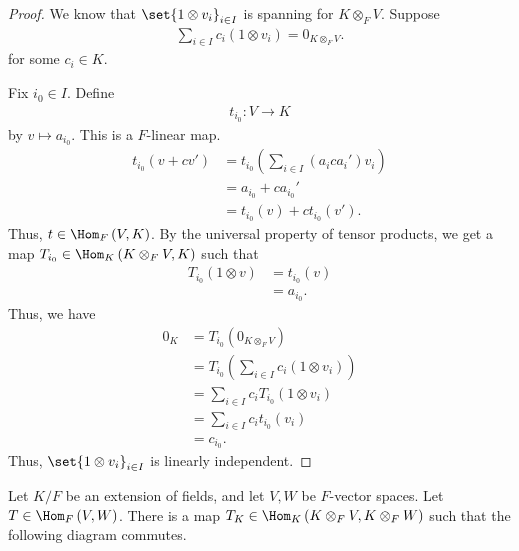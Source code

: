 \documentclass[10pt]{mypackage}
\begin{document}
  \begin{proof}
    We know that $\set{1\otimes v_i}_{i\in I}$ is spanning for $K\otimes_{F}V$. Suppose
    \begin{align*}
      \sum_{i\in I}c_i\left(1\otimes v_i\right) = 0_{K\otimes_{F}V}.
    \end{align*}
    for some $c_i\in K$.\newline

    Fix $i_0\in I$. Define
    \begin{align*}
      t_{i_0}: V \rightarrow K
    \end{align*}
    by $v\mapsto a_{i_0}$. This is a $F$-linear map.
    \begin{align*}
      t_{i_0}\left(v + cv'\right) &= t_{i_0}\left(\sum_{i\in I}\left(a_ica_i'\right) v_i\right)\\
                                  &= a_{i_0} + ca_{i_0}'\\
                                  &= t_{i_0}\left(v\right) + ct_{i_0}\left(v'\right).
    \end{align*}
    Thus, $t\in \Hom_{F}\left(V,K\right)$. By the universal property of tensor products, we get a map $T_{i_0}\in \Hom_{K}\left(K\otimes_{F}V,K\right)$ such that
    \begin{align*}
      T_{i_0}\left(1\otimes v\right) &= t_{i_0}\left(v\right)\\
                                     &= a_{i_0}.
    \end{align*}
    Thus, we have
    \begin{align*}
      0_{K} &= T_{i_0}\left(0_{K\otimes_{F}V}\right)\\
            &= T_{i_0}\left(\sum_{i\in I}c_i\left(1\otimes v_i\right)\right)\\
            &= \sum_{i\in I}c_iT_{i_0}\left(1\otimes v_i\right)\\
            &= \sum_{i\in I}c_it_{i_0}\left(v_i\right)\\
            &= c_{i_0}.
    \end{align*}
    Thus, $\set{1\otimes v_{i}}_{i\in I}$ is linearly independent.
  \end{proof}
  \begin{theorem}
    Let $K/F$ be an extension of fields, and let $V,W$ be $F$-vector spaces. Let $T\in \Hom_{F}\left(V,W\right)$. There is a map $T_{K}\in \Hom_{K}\left(K\otimes_{F}V,K\otimes_{F}W\right)$ such that the following diagram commutes.
    \begin{center}
    \end{center}
  \end{theorem}
\end{document}
